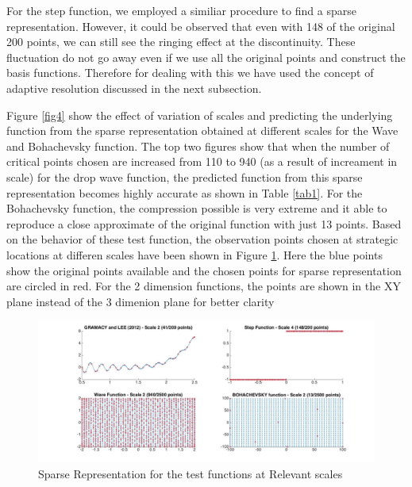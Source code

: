 \documentclass[procedia]{easychair}
\begin{document}
For the step function, we employed a similiar procedure to find a sparse representation. However, it could be observed that even with 148 of the original 200 points, we can still see the ringing effect at the discontinuity. These fluctuation do not go away even if we use all the original points and construct the basis functions. Therefore for dealing with this we have used the concept of adaptive resolution discussed in the next subsection.

Figure \ref{fig4} show the effect of variation of scales and predicting the underlying function from the sparse representation obtained at different scales for the Wave and Bohachevsky function. The top two figures show that when the number of critical points chosen are increased from 110 to 940 (as a result of increament in scale) for the drop wave function, the predicted function from this sparse representation becomes highly accurate as shown in Table \ref{tab1}. For the Bohachevsky function, the compression possible is very extreme and it able to reproduce a close approximate of the original function with just 13 points. Based on the behavior of these test function, the observation points chosen at strategic locations at differen scales have been shown in Figure \ref{fig5}. Here the blue points show the original points available and the chosen points for sparse representation are circled in red. For the 2 dimension functions, the points are shown in the XY plane instead of the 3 dimenion plane for better clarity



\begin{figure}[]  %
	\centering
	\includegraphics[width=6in]{sparse.jpg}
	\caption[Optional caption]{Sparse Representation for the test functions at Relevant scales}
	\label{fig5} %
\end{figure}
\end{document}
